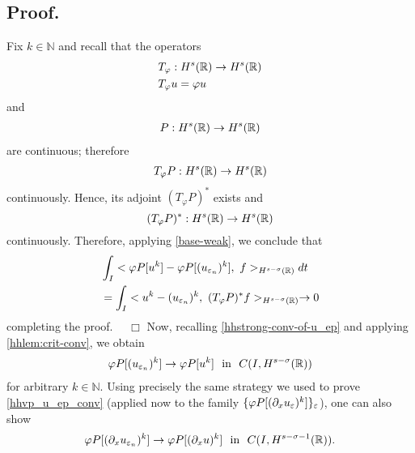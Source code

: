 \subsection{Proof.} 
Fix $k \in \mathbb{N}$ and recall that the operators 
\begin{equation*}
\begin{split}
& T_\varphi: H^s(\mathbb{R}) \to H^s(\mathbb{R})\\
& T_\varphi u = \varphi u
\end{split}
\end{equation*}
and 
\begin{equation*}
\begin{split}
P:H^s(\mathbb{R}) \to H^s(\mathbb{R})
\end{split}
\end{equation*}
are continuous; therefore 
\begin{equation*}
\begin{split}
T_\varphi P: H^s(\mathbb{R}) \to H^s(\mathbb{R})
\end{split}
\end{equation*}
continuously. Hence, its adjoint  $(T_\varphi P)^*$
exists and
\begin{equation*}
(T_\varphi P)^*: H^s(\mathbb{R}) \to H^s(\mathbb{R}) 
\end{equation*}
continuously. Therefore, applying \eqref{base-weak}, we conclude that
\begin{equation}
\label{widpseudo}
\begin{split}
& \int_I <\varphi P[u^k] - \varphi
P [(u_{\varepsilon_n})^k],\  f>_{H^{s-\sigma }(\mathbb{R})} dt
\\
&= \int_I <u^k - 
(u_{\varepsilon_n})^k, \ (T_\varphi P)^* f>_{H^{s-\sigma }(\mathbb{R})} \to 0
\end{split}
\end{equation}
completing the proof. $\quad \Box$
%
%
Now, recalling \eqref{hhstrong-conv-of-u_ep} and applying \cref{hhlem:crit-conv}, we obtain
\begin{equation}
\begin{split}
\varphi P [(u_{\varepsilon_n})^k] \to \varphi P [u^k] \ \ \text{in}  \ \ C(I,
H^{s-\sigma}(\mathbb{R}))
\label{hhvp_u_ep_conv}
\end{split}
\end{equation}
for arbitrary $k \in \mathbb{N}$.  Using precisely the same
strategy we used to prove \eqref{hhvp_u_ep_conv} (applied now to
the family $\{ \varphi P [(\partial_x u_{\varepsilon})^k] \}_\varepsilon$), one can also show
\begin{equation}
\begin{split}
\vp P [ (\p_x u_{\ee_n})^k] \to \vp P [(\p_x u)^k] \ \ \text{in}  \ \ C(I,
H^{s-\sigma -1 }(\rr)).
\end{split}
\end{equation}
